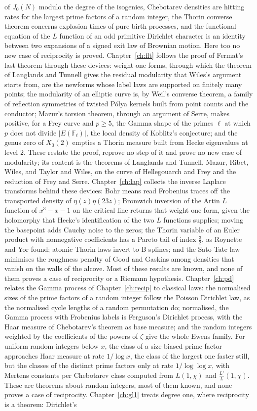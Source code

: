 of $J_0(N)$ modulo the degree of the isogenies, Chebotarev densities are hitting rates for the largest prime factors of a random integer, the Thorin converse theorem concerns explosion times of pure birth processes, and the functional equation of the $L$ function of an odd primitive Dirichlet character is an identity between two expansions of a signed exit law of Brownian motion. Here too no new case of reciprocity is proved. Chapter~\ref{ch:flt} follows the proof of Fermat's last theorem through these devices: weight one forms, through which the theorem of Langlands and Tunnell gives the residual modularity that Wiles's argument starts from, are the newforms whose label laws are supported on finitely many points; the modularity of an elliptic curve is, by Weil's converse theorem, a family of reflection symmetries of twisted P\'olya kernels built from point counts and the conductor; Mazur's torsion theorem, through an argument of Serre, makes positive, for a Frey curve and $p\ge5$, the Gamma shape of the primes $\ell$ at which $p$ does not divide $|E(\mathbb F_\ell)|$, the local density of Koblitz's conjecture; and the genus zero of $X_0(2)$ empties a Thorin measure built from Hecke eigenvalues at level $2$. These restate the proof, reprove no step of it and prove no new case of modularity; its content is the theorems of Langlands and Tunnell, Mazur, Ribet, Wiles, and Taylor and Wiles, on the curve of Hellegouarch and Frey and the reduction of Frey and Serre. Chapter~\ref{ch:lap} collects the inverse Laplace transforms behind these devices: Bohr means read Frobenius traces off the transported density of $\eta(z)\eta(23z)$; Bromwich inversion of the Artin $L$ function of $x^3-x-1$ on the critical line returns that weight one form, given the holomorphy that Hecke's identification of the two $L$ functions supplies; moving the basepoint adds Cauchy noise to the zeros; the Thorin variable of an Euler product with nonnegative coefficients has a Pareto tail of index $\frac32$, as Roynette and Yor found; atomic Thorin laws invert to B splines; and the Sato Tate law minimises the roughness penalty of Good and Gaskins among densities that vanish on the walls of the alcove. Most of these results are known, and none of them proves a case of reciprocity or a Riemann hypothesis. Chapter~\ref{ch:pd} relates the Gamma process of Chapter~\ref{ch:recip} to classical laws: the normalised sizes of the prime factors of a random integer follow the Poisson Dirichlet law, as the normalised cycle lengths of a random permutation do; normalised, the Gamma process with Frobenius labels is Ferguson's Dirichlet process, with the Haar measure of Chebotarev's theorem as base measure; and the random integers weighted by the coefficients of the powers of $\zeta$ give the whole Ewens family. For uniform random integers below $x$, the class of a size biased prime factor approaches Haar measure at rate $1/\log x$, the class of the largest one faster still, but the classes of the distinct prime factors only at rate $1/\log\log x$, with Mertens constants per Chebotarev class computed from $L(1,\chi)$ and $\frac{L'}L(1,\chi)$. These are theorems about random integers, most of them known, and none proves a case of reciprocity. Chapter~\ref{ch:gl1} treats degree one, where reciprocity is a theorem: Dirichlet's 